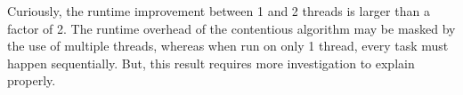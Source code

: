 Curiously, the runtime improvement between 1 and 2 threads is larger than a
factor of 2. The runtime overhead of the contentious algorithm may be masked by
the use of multiple threads, whereas when run on only 1 thread, every task must
happen sequentially. But, this result requires more investigation to explain
properly.

\begin{comment}
With optimization turned on vec behaves a lot like seq. Without
optimization, vec is a lot slower. All these benchmarks use optimization flags,
so the results are almost identical between seq and veche "async"
implementation uses C++ threads with the async
\end{comment}
